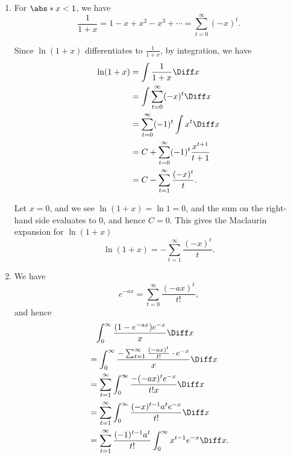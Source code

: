 \Question{\currfilebase}

\begin{enumerate}
    \item For \(\abs*{x} < 1\), we have
          \[
              \frac{1}{1 + x} = 1 - x + x^2 - x^3 + \cdots = \sum_{t = 0}^{\infty} (-x)^t.
          \]

          Since \(\ln (1 + x)\) differentiates to \(\frac{1}{1 + x}\), by integration, we have
          \begin{align*}
              \ln(1 + x) & = \int \frac{1}{1 + x} \Diff x                             \\
                         & = \int \sum_{t = 0}^{\infty} (-x)^t \Diff x                \\
                         & = \sum_{t = 0}^{\infty} (-1)^t \int x^t \Diff x            \\
                         & = C + \sum_{t = 0}^{\infty} (-1)^t \frac{x^{t + 1}}{t + 1} \\
                         & = C - \sum_{t = 1}^{\infty} \frac{(-x)^t}{t}.
          \end{align*}

          Let \(x = 0\), and we see \(\ln (1 + x) = \ln 1 = 0\), and the sum on the right-hand side evaluates to \(0\), and hence \(C = 0\). This gives the Maclaurin expansion for \(\ln(1 + x)\)
          \[
              \ln(1 + x) = - \sum_{t = 1}^{\infty} \frac{(-x)^t}{t}.
          \]

    \item We have
          \[
              e^{-ax} = \sum_{t = 0}^{\infty} \frac{(-ax)^t}{t!},
          \]
          and hence
          \begin{align*}
               & \phantom{=}\int_{0}^{\infty} \frac{(1 - e^{-ax})e^{-x}}{x} \Diff x                              \\
               & = \int_{0}^{\infty} \frac{-\sum_{t = 1}^{\infty} \frac{(-ax)^t}{t!} \cdot e^{-x}}{x} \Diff x    \\
               & = \sum_{t = 1}^{\infty} \int_{0}^{\infty} \frac{- (-ax)^t e^{-x}}{t!x} \Diff x                  \\
               & = \sum_{t = 1}^{\infty} \int_{0}^{\infty} \frac{(-x)^{t - 1} a^t e^{-x}}{t!} \Diff x            \\
               & = \sum_{t = 1}^{\infty} \frac{(-1)^{t - 1} a^t}{t!} \int_{0}^{\infty} x^{t - 1} e^{-x} \Diff x.
          \end{align*}


\end{enumerate}

